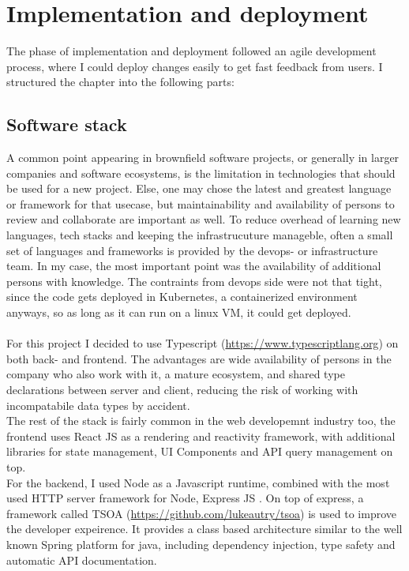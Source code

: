 
%
\chapter{Implementation and deployment}
\label{chap:impl} 

The phase of implementation and deployment followed an agile development process, where I could deploy changes easily to get fast feedback from users.
I structured the chapter into the following parts:

\localtableofcontents


\section{Software stack}

A common point appearing in brownfield software projects, or generally in larger companies and software ecosystems, is the limitation in technologies that should be used for a new project.
Else, one may chose the latest and greatest language or framework for that usecase, but maintainability and availability of persons to review and collaborate are important as well.
To reduce overhead of learning new languages, tech stacks and keeping the infrastrucuture manageble, often a small set of languages and frameworks is provided by the
devops- or infrastructure team. In my case, the most important point was the availability of additional persons with knowledge. The contraints from devops side were not that tight,
since the code gets deployed in Kubernetes, a containerized environment anyways, so as long as it can run on a linux VM, it could get deployed.
\\\\
For this project I decided to use Typescript (\url{https://www.typescriptlang.org}) on both back- and frontend.
The advantages are wide availability of persons in the company who also work with it, a mature ecosystem, and shared type declarations between server and client,
reducing the risk of working with incompatabile data types by accident.
\\
The rest of the stack is fairly common in the web developemnt industry too, the frontend uses React JS as a rendering and reactivity framework,
with additional libraries for state management, UI Components and API query management on top.
\\
For the backend, I used Node as a Javascript runtime, combined with the most used HTTP server framework for Node, Express JS \cite{Github:VanoDevium/node-framework-stars}.
On top of express, a framework called TSOA (\url{https://github.com/lukeautry/tsoa}) is used to improve the developer expeirence. It provides a class based architecture similar
to the well known Spring platform for java, including dependency injection, type safety and automatic API documentation.

